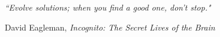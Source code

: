 \documentclass[11pt, twoside]{Thesis} %
\begin{document}
\clearpage %


\pagestyle{empty} %

\null\vfill %

\textit{``Evolve solutions; when you find a good one, don't stop."}

\begin{flushright}
David Eagleman, \textit{Incognito: The Secret Lives of the Brain}
\end{flushright}

\vfill\vfill\vfill\vfill\vfill\vfill\null %

\clearpage %




\end{document}

